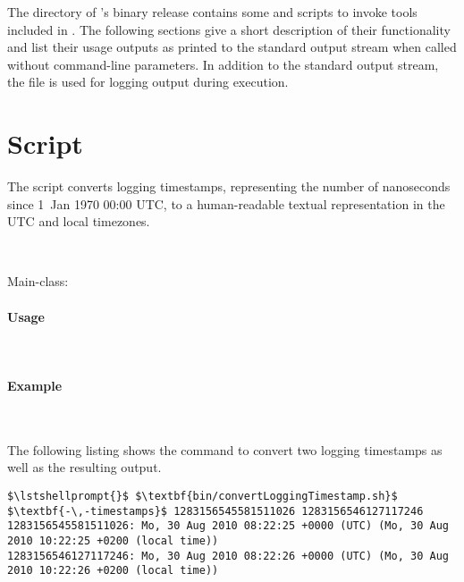 The  directory of \Kieker's binary release contains some   and %
 scripts to invoke tools included in \file{\mainJar{}}. %
The following sections give a short description of their functionality and %
list their usage outputs as printed to the standard output stream when %
called without command-line parameters. %
In addition to the standard output stream, the file  %
is used for logging output during execution.


\section{Script }

The script converts \KiekerMonitoringPart{} logging timestamps, %
representing the number of nanoseconds since 1~Jan 1970 00:00 UTC, to a %
human-readable textual representation in the UTC and local timezones. %

\

\noindent Main-class: {\small {}}

\paragraph*{Usage}\

\setTextListing


\paragraph*{Example}\

The following listing shows the command to convert two logging timestamps as %
well as the resulting output.

\setTextListing
\begin{lstlisting}
$\lstshellprompt{}$ $\textbf{bin/convertLoggingTimestamp.sh}$ $\textbf{-\,-timestamps}$ 1283156545581511026 1283156546127117246 
1283156545581511026: Mo, 30 Aug 2010 08:22:25 +0000 (UTC) (Mo, 30 Aug 2010 10:22:25 +0200 (local time))
1283156546127117246: Mo, 30 Aug 2010 08:22:26 +0000 (UTC) (Mo, 30 Aug 2010 10:22:26 +0200 (local time))
\end{lstlisting}


